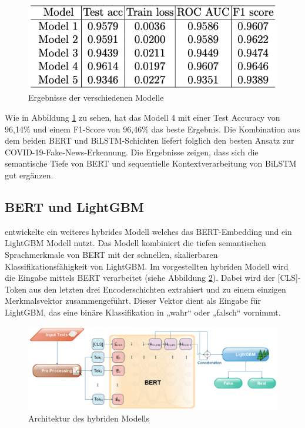\begin{figure}[htbp]
    \begin{center}
    \includegraphics[scale=0.4]{static/bert_bilstm_results.png}
    \caption{\label{fig:bert_bilstm_results} Ergebnisse der verschiedenen Modelle \cite{wang2021covid19fakenewsdetection}}
    \end{center}
\end{figure}

Wie in Abbildung \ref{fig:bert_bilstm_results} zu sehen, hat das Modell 4 mit einer Test Accuracy von 96,14\% und einem F1-Score von 96,46\%
das beste Ergebnis.
Die Kombination aus dem beiden BERT und BiLSTM-Schichten liefert folglich den besten Ansatz zur COVID-19-Fake-News-Erkennung. 
Die Ergebnisse zeigen, dass sich die semantische Tiefe von BERT und sequentielle Kontextverarbeitung von BiLSTM gut ergänzen.

\subsection{BERT und LightGBM}
\label{sec:bert_lightgbm}

\cite{Essa:2023aa} entwickelte ein weiteres hybrides Modell welches das BERT-Embedding und ein LightGBM Modell nutzt.
Das Modell kombiniert die tiefen semantischen Sprachmerkmale von BERT mit der schnellen, skalierbaren Klassifikationsfähigkeit von LightGBM.
Im vorgestellten hybriden Modell wird die Eingabe mittels BERT verarbeitet (siehe Abbildung \ref{fig:bert_lightgbt_architecture}). 
Dabei wird der [CLS]-Token aus den letzten drei Encoderschichten extrahiert und zu einem einzigen Merkmalsvektor zusammengeführt. 
Dieser Vektor dient als Eingabe für LightGBM, das eine binäre Klassifikation in „wahr“ oder „falsch“ vornimmt.

\begin{figure}[htbp]
    \begin{center}
    \includegraphics[scale=0.32]{static/bert_lightgbt_architecture.png}
    \caption{\label{fig:bert_lightgbt_architecture} Architektur des hybriden Modells \cite{Essa:2023aa}}
    \end{center}
\end{figure}

